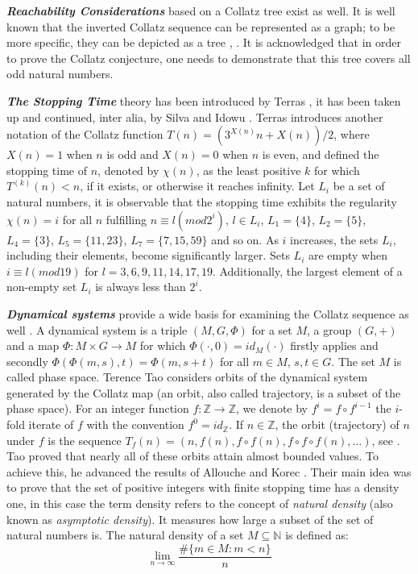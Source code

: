 \par\medskip
\textit{\textbf{Reachability Considerations}} based on a Collatz tree exist as well. It is well known that the inverted Collatz sequence can be represented as a graph; to be more specific, they can be depicted as a tree \cite{Ref_Andrei_Masalagiu}, \cite{Ref_Kak_2014}. It is acknowledged that in order to prove the Collatz conjecture, one needs to demonstrate that this tree covers all odd natural numbers.

\par\medskip
\textit{\textbf{The Stopping Time}} theory has been introduced by Terras \cite{Ref_Terras_1976}, it has been taken up and continued, inter alia, by Silva \cite{Ref_Silva_1999} and Idowu \cite{Ref_Idowu_2015}. Terras introduces another notation of the Collatz function $T(n)=(3^{X(n)}n+X(n))/2$, where $X(n)=1$ when $n$ is odd and $X(n)=0$ when $n$ is even, and defined the stopping time of $n$, denoted by $\chi(n)$, as the least positive $k$ for which $T^{(k)}(n)<n$, if it exists, or otherwise it reaches infinity. Let $L_i$ be a set of natural numbers, it is observable that the stopping time exhibits the regularity $\chi(n)=i$ for all $n$ fulfilling $n\equiv l(mod 2^i)$, $l\in L_i$, $L_1=\{4\}$, $L_2=\{5\}$, $L_4=\{3\}$, $L_5=\{11,23\}$, $L_7=\{7,15,59\}$ and so on. As $i$ increases, the sets $L_i$, including their elements, become significantly larger. Sets $L_i$ are empty when $i\equiv l(mod 19)$ for $l=3,6,9,11,14,17,19$. Additionally, the largest element of a non-empty set $L_i$ is always less than $2^i$.

\par\medskip
\textit{\textbf{Dynamical systems}} provide a wide basis for examining the Collatz sequence as well \cite{Ref_Wirsching_1998}. A dynamical system \cite[p.~464]{Ref_Walz_2017} is a triple $(M,G,\Phi)$ for a set $M$, a group $(G,+)$ and a map $\Phi:M\times G\to M$ for which $\Phi(\cdot,0)=id_M(\cdot)$ firstly applies and secondly $\Phi\left(\Phi(m,s),t\right)=\Phi(m,s+t)$ for all $m\in M$, $s,t\in G$. The set $M$ is called phase space. Terence Tao \cite{Ref_Tao_2019} considers orbits of the dynamical system generated by the Collatz map (an orbit, also called trajectory, is a subset of the phase space). For an integer function $f:\mathbb{Z}\rightarrow\mathbb{Z}$, we denote by $f^i=f\circ f^{i-1}$ the $i$-fold iterate of $f$ with the convention $f^0=id_\mathbb{Z}$. If $n\in\mathbb{Z}$, the orbit (trajectory) of $n$ under $f$ is the sequence $T_f(n)=\left(n,f(n),f\circ f(n),f\circ f\circ f(n),\ldots\right)$, see \cite[p.~10]{Ref_Wirsching_1998}. Tao proved that nearly all of these orbits attain almost bounded values. To achieve this, he advanced the results of Allouche \cite{Ref_Allouche_1978} and Korec \cite{Ref_Korec_1994}. Their main idea was to prove that the set of positive integers with finite stopping time has a density one, in this case the term density refers to the concept of \textit{natural density} (also known as \textit{asymptotic density}). It measures how large a subset of the set of natural numbers is. The natural density of a set $M\subseteq\mathbb{N}$ is defined as:
\[
\lim_{n\to\infty}\frac{\#\{m\in M:m<n\}}{n}
\]

